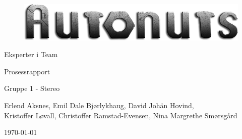 \begin{titlepage}
\begin{center}
\vspace*{1in}
\begin{figure}[H]
		\centering
		\includegraphics[width=1.00\textwidth]{images/logo.png}
		\label{fig:logo}
	\end{figure}
\vspace{3in}
{\LARGE Eksperter i Team}
\par
\vspace{0.2in}
{\LARGE Prosessrapport}
\par
\vspace{0.2in}
{\Large Gruppe 1 - Stereo}
\par
\vfill
\par
\vspace{0.1in}
Erlend Aksnes, Emil Dale Bjørlykhaug, David Johän Hovind, \\Kristoffer Løvall, Christoffer Ramstad-Evensen, Nina Margrethe Smørsgård
\par
\vspace{0.4cm}
\today
\end{center}
\end{titlepage}
